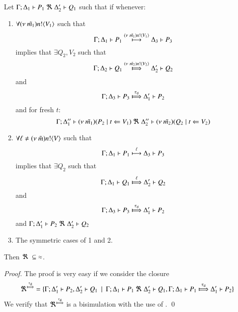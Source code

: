 \begin{lemma}\rm
	\label{lem:up_to_deterministic_transition}
	Let $\Gamma; \Delta_1 \vdash P_1 \ \Re\  \Delta_2' \vdash Q_1$ such
	that if whenever:
%
	\begin{enumerate}
		\item	$\forall (\nu\ \tilde{m_1}) n ! \langle V_1 \rangle$ such that
			\[
				\Gamma; \Delta_1 \vdash P_1 \stackrel{(\nu\ \tilde{m_1}) n ! \langle V_1 \rangle}{\longmapsto} \Delta_3 \vdash P_3
			\]
			implies that $\exists Q_2, V_2$ such that
			\[
				\horel{\Gamma}{\Delta_2}{Q_1}{\Hby{\news{\tilde{m_2}} \bactout{n}{V_2}}}{\Delta_2'}{Q_2}
			\]
			and
			\[
				\horel{\Gamma}{\Delta_3}{P_3}{\Hby{\dtau}}{\Delta_1'}{P_2}
			\]
			and for fresh $t$:
			\[
				\Gamma; \Delta_1'' \vdash (\nu\ \tilde{m_1})(P_2 \;|\; t \Leftarrow V_1) \ \Re\  \Delta_2'' \vdash{(\nu\ \tilde{m_2})(Q_2 \;|\;t \Leftarrow V_2)}
			\]
%
		\item	$\forall \ell \not= (\nu\ \tilde{m}) n ! \langle V \rangle$ such that
			\[
				\Gamma; \Delta_1 \vdash P_1 \stackrel{\ell}{\longmapsto} \Delta_3 \vdash P_3
			\]
			implies that $\exists Q_2$ such that 
			\[
				\horel{\Gamma}{\Delta_1}{Q_1}{\Hby{\ell}}{\Delta_2'}{Q_2}
			\]
			and
			\[
				\horel{\Gamma}{\Delta_3}{P_3}{\Hby{\dtau}}{\Delta_1'}{P_2}
			\]
			and
			$\Gamma; \Delta_1' \vdash P_2 \ \Re\  \Delta_2' \vdash Q_2$

		\item	The symmetric cases of 1 and 2.
	\end{enumerate}
	Then $\Re\ \subseteq\ \approx$.
\end{lemma}


\begin{proof}
	The proof is very easy if we consider the
	closure
	\[
		\Re^{\Hby{\dtau}} = \set{ \horel{\Gamma}{\Delta_1'}{P_2}{,}{\Delta_2'}{Q_1} \setbar \horel{\Gamma}{\Delta_1}{P_1}{\ \Re\ }{\Delta_2'}{Q_1},
		\horel{\Gamma}{\Delta_1}{P_1}{\Hby{\dtau}}{\Delta_1'}{P_2} }
	\]
	We verify that $\Re^{\Hby{\dtau}}$ is a bisimulation with
	the use of .
	\qed
\end{proof}

